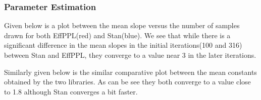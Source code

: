 \documentclass[a4paper,11pt]{article}
\theoremstyle{mytheor}
\begin{document}
        \subsubsection{Parameter Estimation}
            Given below is a plot between the mean slope versus the number of samples drawn for both EffPPL(red) and Stan(blue). We see that while there is a significant difference in the mean slopes in the initial iterations(100 and 316) between Stan and EffPPL, they converge to a value near 3 in the later iterations. 
            \begin{center}
                
            \end{center}
            
            Similarly given below is the similar comparative plot between the mean constants obtained by the two libraries. As can be see they both converge to a value close to 1.8 although Stan converges a bit faster.
            
\end{document}
